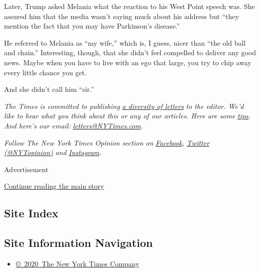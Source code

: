 Later, Trump asked Melania what the reaction to his West Point speech
was. She assured him that the media wasn't saying much about his address
but ``they mention the fact that you may have Parkinson's disease.''

He referred to Melania as ``my wife,'' which is, I guess, nicer than
``the old ball and chain.'' Interesting, though, that she didn't feel
compelled to deliver any good news. Maybe when you have to live with an
ego that large, you try to chip away every little chance you get.

And she didn't call him ``sir.''

\emph{The Times is committed to publishing}
\href{https://www.nytimes3xbfgragh.onion/2019/01/31/opinion/letters/letters-to-editor-new-york-times-women.html}{\emph{a
diversity of letters}} \emph{to the editor. We'd like to hear what you
think about this or any of our articles. Here are some}
\href{https://help.nytimes3xbfgragh.onion/hc/en-us/articles/115014925288-How-to-submit-a-letter-to-the-editor}{\emph{tips}}\emph{.
And here's our email:}
\href{mailto:letters@NYTimes.com}{\emph{letters@NYTimes.com}}\emph{.}

\emph{Follow The New York Times Opinion section on}
\href{https://www.facebookcorewwwi.onion/nytopinion}{\emph{Facebook}}\emph{,}
\href{http://twitter.com/NYTOpinion}{\emph{Twitter (@NYTopinion)}}
\emph{and}
\href{https://www.instagram.com/nytopinion/}{\emph{Instagram}}\emph{.}

Advertisement

\protect\hyperlink{after-bottom}{Continue reading the main story}

\hypertarget{site-index}{%
\subsection{Site Index}\label{site-index}}

\hypertarget{site-information-navigation}{%
\subsection{Site Information
Navigation}\label{site-information-navigation}}

\begin{itemize}
\tightlist
\item
  \href{https://help.nytimes3xbfgragh.onion/hc/en-us/articles/115014792127-Copyright-notice}{©~2020~The
  New York Times Company}
\end{itemize}

